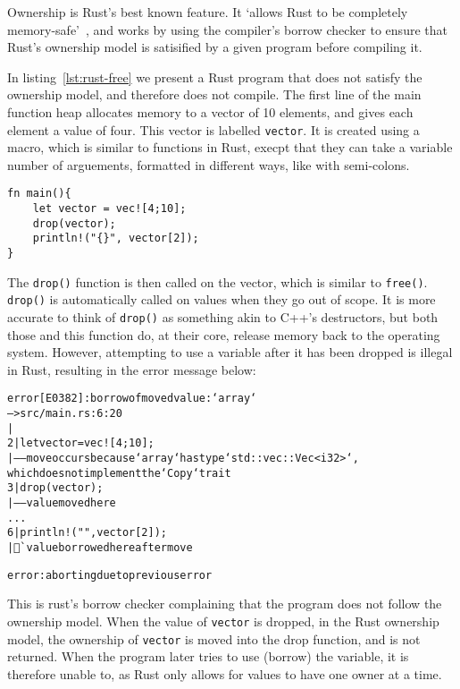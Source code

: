 Ownership is Rust's best known feature. It `allows Rust to be completely memory-safe'~\cite{NomOwner}, and works by using the compiler's borrow checker to ensure that Rust's ownership model is satisified by a given program before compiling it.

In listing~\ref{lst:rust-free} we present a Rust program that does not satisfy the ownership model, and therefore does not compile. The first line of the main function heap allocates memory to a vector of 10 elements, and gives each element a value of four. This vector is labelled \texttt{vector}. It is created using a macro, which is similar to functions in Rust, execpt that they can take a variable number of arguements, formatted in different ways, like with semi-colons.

\begin{code}
\begin{verbatim}
fn main(){
    let vector = vec![4;10];
    drop(vector);
    println!("{}", vector[2]);
}
\end{verbatim}
\label{lst:rust-free}
\end{code}

The \texttt{drop()} function is then called on the vector, which is similar to \texttt{free()}. \texttt{drop()} is automatically called on values when they go out of scope. It is more accurate to think of \texttt{drop()} as something akin to C++'s destructors, but both those and this function do, at their core, release memory back to the operating system. However, attempting to use a variable after it has been dropped is illegal in Rust, resulting in the error message below:

\begin{alltt}
\scriptsize
error[E0382]: borrow of moved value: `array`
 --> src/main.rs:6:20
  |
2 |     let vector = vec![4;10];
  |         ----- move occurs because `array` has type `std::vec::Vec<i32>`,
  which does not implement the `Copy` trait
3 |     drop(vector);
  |          ----- value moved here
...
6 |     println!("{}", vector[2]);
  |                    ^^^^^ value borrowed here after move

error: aborting due to previous error
\end{alltt}

This is rust's borrow checker complaining that the program does not follow the ownership model. When the value of \texttt{vector} is dropped, in the Rust ownership model, the ownership of \texttt{vector} is moved into the drop function, and is not returned. When the program later tries to use (borrow) the variable, it is therefore unable to, as Rust only allows for values to have one owner at a time.

